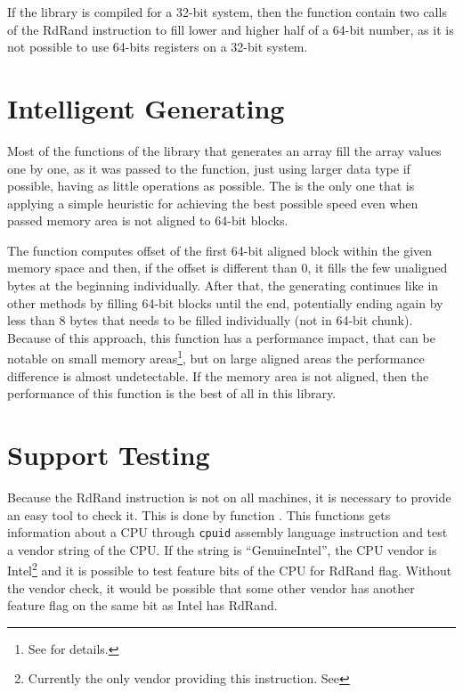 \par{
If the library is compiled for a 32-bit system, then the  function contain two calls of the RdRand instruction to fill lower and higher half of a 64-bit number, as it is not possible to use 64-bits registers on a 32-bit system. 
}
\section{Intelligent Generating}
\par{
Most of the functions of the library that generates an array fill the array values one by one, as it was passed to the function, just using larger data type if possible, having as little operations as possible. The  is the only one that is applying a simple heuristic for achieving the best possible speed even when passed memory area is not aligned to 64-bit blocks.
}

\par{
The function computes offset of the first 64-bit aligned block within the given memory space and then, if the offset is different than 0, it fills the few unaligned bytes at the beginning individually. After that, the generating continues like in other methods by filling 64-bit blocks until the end, potentially ending again by less than 8 bytes that needs to be filled individually (not in 64-bit chunk). Because of this approach, this function has a performance impact, that can be notable on small memory areas\footnote{See  for details.}, but on large aligned areas the performance difference is almost undetectable. If the memory area is not aligned, then the performance of this function is the best of all in this library.
}

\section{Support Testing}
\par{
Because the RdRand instruction is not on all machines, it is necessary to provide an easy tool to check it. This is done by function . This functions gets information about a CPU through {\tt cpuid} assembly language instruction and test a vendor string of the CPU. If the string is ``GenuineIntel'', the CPU vendor is Intel\footnote{Currently the only vendor providing this instruction. See } and it is possible to test feature bits of the CPU for RdRand flag. Without the vendor check, it would be possible that some other vendor has another feature flag on the same bit as Intel has RdRand.
}


